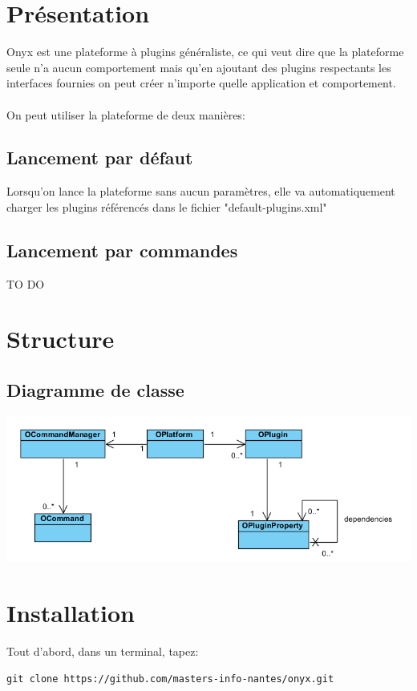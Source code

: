 \section{Présentation}

Onyx est une plateforme à plugins généraliste, ce qui veut dire que la plateforme seule n'a aucun comportement mais qu'en ajoutant des plugins respectants les interfaces fournies on peut créer n'importe quelle application et comportement.
\\
\\
On peut utiliser la plateforme de deux manières:


\subsection{Lancement par défaut}

Lorsqu'on lance la plateforme sans aucun paramètres, elle va automatiquement charger les plugins référencés dans le fichier "default-plugins.xml"

\subsection{Lancement par commandes}

TO DO

\section{Structure}

\subsection{Diagramme de classe}
\includegraphics[width=15cm]{figures/class_diagram.png}
\newpage
\section{Installation}

Tout d’abord, dans un terminal, tapez:
\begin{verbatim}
git clone https://github.com/masters-info-nantes/onyx.git
\end{verbatim}

